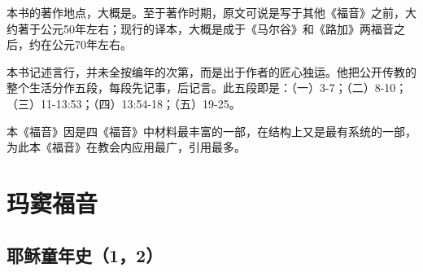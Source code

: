 本书的著作地点，大概是\UL[耶路撒冷]。至于著作时期，原文可说是写于其他《福音》之前，大约著于公元50年左右；现行的\UL[希腊]译本，大概是成于《马尔谷》和《路加》两福音之后，约在公元70年左右。

本书记述\UL[耶稣]言行，并未全按编年的次第，而是出于作者的匠心独运。他把\UL[耶稣]公开传教的整个生活分作五段，每段先记事，后记言。此五段即是：（一）3-7；（二）8-10；（三）11-13:53；（四）13:54-18；（五）19-25。

本《福音》因是四《福音》中材料最丰富的一部，在结构上又是最有系统的一部，为此本《福音》在教会内应用最广，引用最多。


\chapter{玛窦福音}


\section{耶稣童年史（1，2）}


